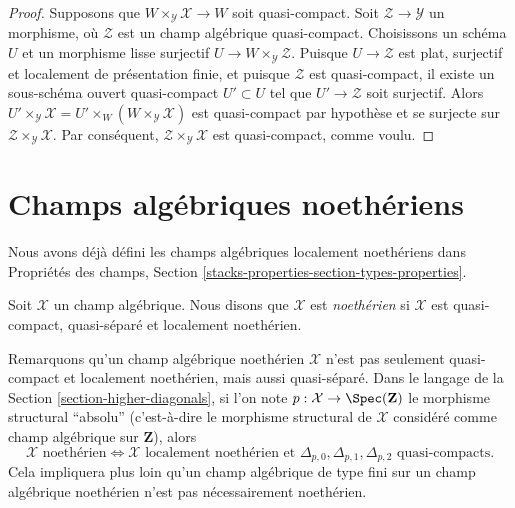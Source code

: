 \begin{proof}
Supposons que $W \times_\mathcal{Y} \mathcal{X} \to W$ soit quasi-compact.
Soit $\mathcal{Z} \to \mathcal{Y}$ un morphisme, où $\mathcal{Z}$ est un
champ algébrique quasi-compact. Choisissons un schéma $U$ et un morphisme
lisse surjectif $U \to W \times_\mathcal{Y} \mathcal{Z}$. Puisque
$U \to \mathcal{Z}$ est plat, surjectif et localement de présentation finie,
et puisque $\mathcal{Z}$ est quasi-compact, il existe un sous-schéma ouvert
quasi-compact $U' \subset U$ tel que $U' \to \mathcal{Z}$ soit surjectif.
Alors
$U' \times_\mathcal{Y} \mathcal{X} =
U' \times_W (W \times_\mathcal{Y} \mathcal{X})$
est quasi-compact par hypothèse et se surjecte sur
$\mathcal{Z} \times_\mathcal{Y} \mathcal{X}$. Par conséquent,
$\mathcal{Z} \times_\mathcal{Y} \mathcal{X}$ est quasi-compact, comme voulu.
\end{proof}











\section{Champs algébriques noethériens}
\label{section-noetherian}

\noindent
Nous avons déjà défini les champs algébriques localement noethériens dans
Propriétés des champs, Section
\ref{stacks-properties-section-types-properties}.

\begin{definition}
\label{definition-noetherian}
Soit $\mathcal{X}$ un champ algébrique. Nous disons que $\mathcal{X}$ est
{\it noethérien} si $\mathcal{X}$ est quasi-compact, quasi-séparé et
localement noethérien.
\end{definition}

\noindent
Remarquons qu'un champ algébrique noethérien $\mathcal{X}$ n'est pas seulement
quasi-compact et localement noethérien, mais aussi quasi-séparé. Dans le
langage de la Section \ref{section-higher-diagonals}, si l'on note
$p : \mathcal{X} \to \Spec(\mathbf{Z})$ le morphisme structural
``absolu'' (c'est-à-dire le morphisme structural de $\mathcal{X}$ considéré
comme champ algébrique sur $\mathbf{Z}$), alors
$$
\mathcal{X}\text{ noethérien}
\Leftrightarrow
\mathcal{X}\text{ localement noethérien et }
\Delta_{p, 0}, \Delta_{p, 1}, \Delta_{p, 2}
\text{ quasi-compacts}.
$$
Cela impliquera plus loin qu'un champ algébrique de type fini sur un champ
algébrique noethérien n'est pas nécessairement noethérien.

